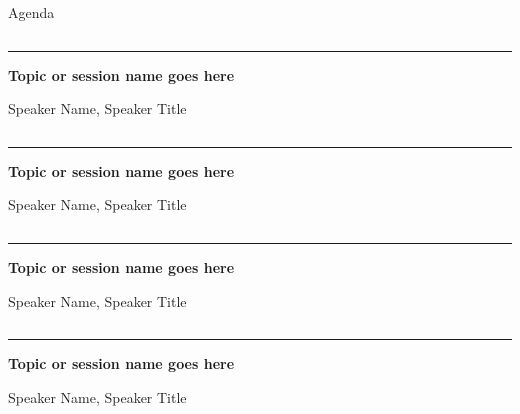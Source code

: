 \documentclass[aspectratio=169, t, 9pt]{beamer} %
\begin{document}
\begin{frame}[FloatingTitle]{Agenda}
\begin{groupcolumns}
    \hfill
    \begin{column}{0.3\textwidth}

        \vspace{8pt}
        \hrule %
        \vspace{8pt}

        \textbf{Topic or session name goes here}
        \vspace{4pt}

        Speaker Name, Speaker Title
    \end{column}
    \begin{column}{0.3\textwidth}

        \vspace{8pt}
        \hrule %
        \vspace{8pt}

        \textbf{Topic or session name goes here}
        \vspace{4pt}

        Speaker Name, Speaker Title
    \end{column}
    \begin{column}{0.3\textwidth}

        \vspace{8pt}
        \hrule %
        \vspace{8pt}

        \textbf{Topic or session name goes here}
        \vspace{4pt}

        Speaker Name, Speaker Title
    \end{column}
    \hfill
\end{groupcolumns}
\vfill
\begin{groupcolumns}
    \hfill
    \begin{column}{0.3\textwidth}

        \vspace{8pt}
        \hrule %
        \vspace{8pt}

        \textbf{Topic or session name goes here}
        \vspace{4pt}

        Speaker Name, Speaker Title
    \end{column}
    \begin{column}{0.3\textwidth}


\end{column}
\end{groupcolumns}
\end{frame}
\end{document}
